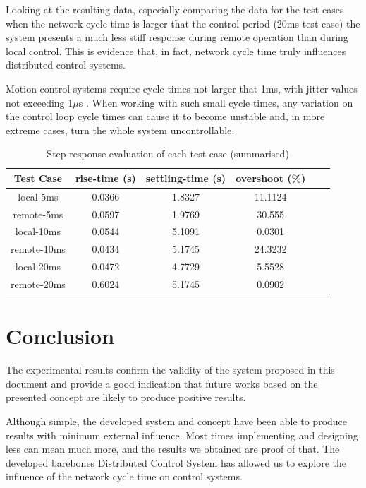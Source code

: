 \documentclass[a4paper]{IEEEtran}
\begin{document}
Looking at the resulting data, especially comparing the data for the test cases when the network cycle time is larger that the control period (20ms test case) the system presents a much less stiff response during remote operation than during local control.
This is evidence that, in fact, network cycle time truly influences distributed control systems.

Motion control systems require cycle times not larger that 1ms, with jitter values not exceeding 1$\mu$s \cite{rte:rte-for-automation}.
When working with such small cycle times, any variation on the control loop cycle times can cause it to become unstable and, in more extreme cases, turn the whole system uncontrollable.

\begin{table}[h]
	\centering
	\caption{Step-response evaluation of each test case (summarised)}
	\label{tab:step-analysis}
	\begin{tabular}{|c|c|c|c|c|c|}
		\hline
		Test Case   & rise-time (s) & settling-time (s) & overshoot (\%) \\
		\hline
		local-5ms   & 0.0366 & 1.8327 & 11.1124 \\
		\hline
		remote-5ms  & 0.0597 & 1.9769 & 30.555 \\
		\hline
		local-10ms  & 0.0544 & 5.1091 & 0.0301 \\
		\hline
		remote-10ms & 0.0434 & 5.1745 & 24.3232 \\
		\hline
		local-20ms  & 0.0472 & 4.7729 & 5.5528 \\
		\hline
		remote-20ms & 0.6024 & 5.1745 & 0.0902 \\
		\hline
	\end{tabular}
\end{table}

\section{Conclusion}

The experimental results confirm the validity of the system proposed in this document and provide a good indication that future works based on the presented concept are likely to produce positive results.

Although simple, the developed system and concept have been able to produce results with minimum external influence.
Most times implementing and designing less can mean much more, and the results we obtained are proof of that.
The developed barebones Distributed Control System has allowed us to explore the influence of the network cycle time on control systems.
\end{document}
